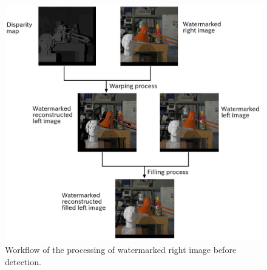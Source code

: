 \begin{figure}[h!]
\centering
\includegraphics[width=1\textwidth]{./img/detection_workflow.jpg}
\caption{\small{Workflow of the processing of watermarked right image before detection.}}
\label{fig:detflow}
\end{figure}

